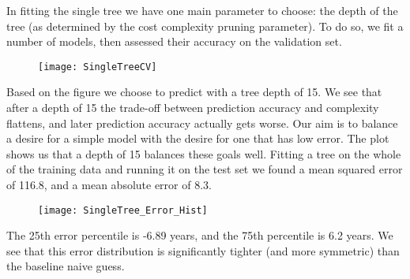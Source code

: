 \documentclass[letterpaper, 10 pt, conference]{ieeeconf}  %
\begin{document}
In fitting the single tree we have one main parameter to choose: the depth of the tree (as determined by the cost complexity pruning parameter). To do so, we fit a number of models, then assessed their accuracy on the validation set.
\begin{figure}[ht]
\label{Single Tree CV}
\begin{center}
\texttt{[image: SingleTreeCV]}
\end{center}
\end{figure}
Based on the figure we choose to predict with a tree depth of 15. We see that after a depth of 15 the trade-off between prediction accuracy and complexity flattens, and later prediction accuracy actually gets worse. Our aim is to balance a desire for a simple model with the desire for one that has low error. The plot shows us that a depth of 15 balances these goals well. Fitting a tree on the whole of the training data and running it on the test set we found a mean squared error of 116.8, and a mean absolute error of 8.3.
\begin{figure}[ht]
\label{Single Tree Error}
\begin{center}
\texttt{[image: SingleTree\_Error\_Hist]}
\end{center}
\end{figure}
The 25th error percentile is -6.89 years, and the 75th percentile is 6.2 years. We see that this error distribution is significantly tighter (and more symmetric) than the baseline naive guess. 
\end{document}
